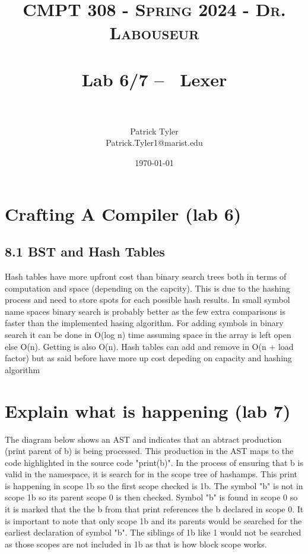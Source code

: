 \documentclass[letterpaper, 10pt]{article}
\title{	
   \normalfont \normalsize 
   \textsc{CMPT 308 - Spring 2024 - Dr. Labouseur} \\[10pt] %
   \horrule{0.5pt} \\[0.25cm] 	%
   \huge Lab 6/7 -- ~Lexer \\     	    %
   \horrule{0.5pt} \\[0.25cm] 	%
}
\author{Patrick Tyler \\ \normalsize Patrick.Tyler1@marist.edu}
\date{\normalsize\today} 	%
\begin{document}
\maketitle %


\section{Crafting A Compiler (lab 6)}
\subsection{8.1 BST and Hash Tables}
Hash tables have more upfront cost than binary search trees both
    in terms of computation and space (depending on the capcity).
This is due to the hashing process and need to store spots for each
    possible hash results. 
In small symbol name spaces binary search is probably better as
    the few extra comparisons is faster than the implemented
    hasing algorithm.
For adding symbols in binary search it can be done in O(log n) time
    assuming space in the array is left open else O(n).
Getting is also O(n).
Hash tables can add and remove in O(n + load factor) but as said before have
    more up cost depeding on capacity and hashing algorithm
\section{Explain what is happening (lab 7)}
The diagram below shows an AST and indicates that an abtract
   production (print parent of b) is being processed.
This production in the AST maps to the code highlighted in
   the source code "print(b)".
In the process of ensuring that b is valid in the namespace,
   it is search for in the scope tree of hashamps.
This print is happening in scope 1b so the first scope checked is
   1b.
The symbol "b" is not in scope 1b so its parent scope 0 is then 
    checked.
Symbol "b" is found in scope 0 so it is marked that the the b from
    that print references the b declared in scope 0.
It is important to note that only scope 1b and its parents would
    be searched for the earliest declaration of symbol "b".
The siblings of 1b like 1 would not be searched as those scopes are 
    not included in 1b as that is how block scope works.
\end{document}
